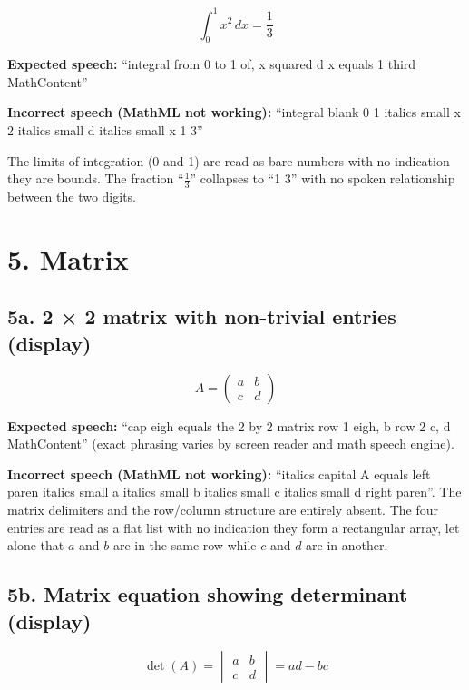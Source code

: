 \documentclass{article}
\begin{document}
\[
  \int_{0}^{1} x^2 \, dx = \frac{1}{3}
\]

\textbf{Expected speech:} ``integral from 0 to 1 of, x squared d x equals 1 third  
MathContent''

\textbf{Incorrect speech (MathML not working):} ``integral blank 0 1 italics small x 
2 italics small d italics small x 1 3''

The limits of integration (0 and 1) are
read as bare numbers with no indication they are bounds. The fraction
``$\frac{1}{3}$'' collapses to ``1 3'' with no spoken relationship between
the two digits.

\section*{5. Matrix}

\subsection*{5a. 2 × 2 matrix with non-trivial entries (display)}

\[
  A = \begin{pmatrix} a & b \\ c & d \end{pmatrix}
\]

\textbf{Expected speech:} ``cap eigh equals the 2 by 2 matrix row 1 eigh, b row 2 c, d  
MathContent'' (exact phrasing varies by screen reader and math speech
engine).

\textbf{Incorrect speech (MathML not working):} ``italics capital A equals left paren italics small a italics small b italics small c italics small d right paren''.
The matrix delimiters and the row/column structure are entirely absent.
The four entries are read as a flat list with no indication they form a
rectangular array, let alone that $a$ and $b$ are in the same row while
$c$ and $d$ are in another.

\subsection*{5b. Matrix equation showing determinant (display)}

\[
  \det(A) = \begin{vmatrix} a & b \\ c & d \end{vmatrix} = ad - bc
\]
\end{document}
